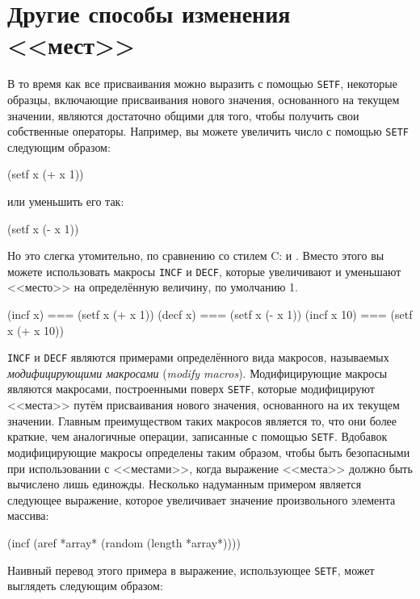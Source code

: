 \section{Другие способы изменения <<мест>>}

В то время как все присваивания можно выразить с помощью \lstinline{SETF}, некоторые образцы,
включающие присваивания нового значения, основанного на текущем значении, являются
достаточно общими для того, чтобы получить свои собственные операторы. Например, вы можете
увеличить число с помощью \lstinline{SETF} следующим образом:

\begin{myverb}
  (setf x (+ x 1))
\end{myverb}

\noindent{}или уменьшить его так:

\begin{myverb}
  (setf x (- x 1))
\end{myverb}

Но это слегка утомительно, по сравнению со стилем C:  и . Вместо этого
вы можете использовать макросы \lstinline{INCF} и \lstinline{DECF}, которые увеличивают и
уменьшают <<место>> на определённую величину, по умолчанию 1.

\begin{myverb}
  (incf x)    === (setf x (+ x 1))
  (decf x)    === (setf x (- x 1))
  (incf x 10) === (setf x (+ x 10))
\end{myverb}

\lstinline{INCF} и \lstinline{DECF} являются примерами определённого вида макросов, называемых
\textit{модифицирующими макросами} (\textit{modify macros}). Модифицирующие макросы
являются макросами, построенными поверх \lstinline{SETF}, которые модифицируют <<места>> путём
присваивания нового значения, основанного на их текущем значении. Главным преимуществом
таких макросов является то, что они более краткие, чем аналогичные операции, записанные с
помощью \lstinline{SETF}. Вдобавок модифицирующие макросы определены таким образом, чтобы
быть безопасными при использовании с <<местами>>, когда выражение <<места>> должно быть
вычислено лишь единожды. Несколько надуманным примером является следующее выражение,
которое увеличивает значение произвольного элемента массива:

\begin{myverb}
  (incf (aref *array* (random (length *array*))))
\end{myverb}

Наивный перевод этого примера в выражение, использующее \lstinline{SETF}, может выглядеть
следующим образом:


